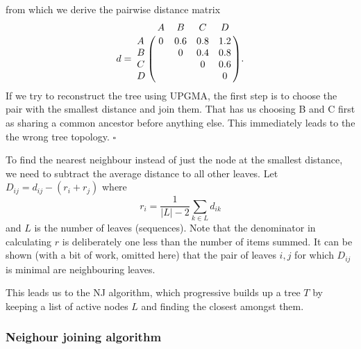 \documentclass[11pt]{article}
\newcommand{\sqend}{\hfill $\square$}
\begin{document}

from which we derive the pairwise distance matrix  
\[ d = \bordermatrix{~ & A & B & C & D \cr
              A & 0 & 0.6 & 0.8 & 1.2 \cr
              B &  & 0 & 0.4 & 0.8 \cr
              C &  &  & 0 & 0.6 \cr
              D &  &  &  & 0 \cr}.
\]
If we try to reconstruct the tree using UPGMA, the first step is to choose the pair with the smallest distance and join them. That  has us choosing B and C first as sharing a common ancestor before anything else.  This immediately leads to the the wrong tree topology.  \sqend

To find the nearest neighbour instead of just the node at the smallest distance, we need to subtract the average distance to all other leaves.  Let
$D_{ij} = d_{ij} - (r_i + r_j)$ where 
\[ r_i = \frac1{|L| - 2} \sum_{k\in L} d_{ik} \]
and $L$ is the number of leaves (sequences).  Note that the denominator in calculating $r$ is deliberately one less than the number of items summed.  It can be shown (with a bit of work, omitted here) that the pair of leaves $i,j$ for which $D_{ij}$ is minimal are  neighbouring leaves.  

This leads us to the NJ algorithm, which progressive builds up a tree $T$ by keeping a list of active nodes $L$ and finding the closest amongst them.

\subsubsection*{Neighour joining algorithm}
\end{document}
